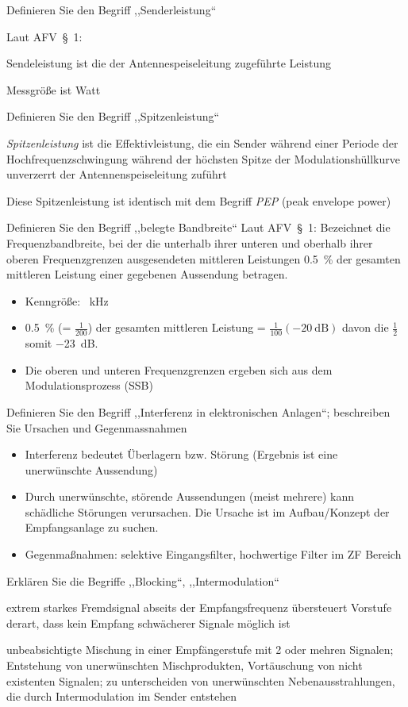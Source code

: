 \documentclass[avery5371,grid,frame,a4paper]{flashcards}
\newcommand{\card}[3]{
  \begin{flashcard}[{\chap} -- #1]{#2}#3\end{flashcard}
}
\begin{document}
\card{98}{Definieren Sie den Begriff ,,Senderleistung``}{
  \item
  Laut AFV~§~1:

  \item
  Sendeleistung ist die der Antennespeiseleitung zugeführte Leistung

  \item
  Messgröße ist Watt
}
\card{99}{Definieren Sie den Begriff ,,Spitzenleistung``}{
  \item
  \emph{Spitzenleistung} ist die Effektivleistung, die ein Sender während einer Periode der Hochfrequenzschwingung während der höchsten Spitze der Modulationshüllkurve unverzerrt der Antennenspeiseleitung zuführt

  \item Diese Spitzenleistung ist identisch mit dem Begriff \emph{PEP} (peak envelope power)
}
\card{100}{Definieren Sie den Begriff ,,belegte Bandbreite``}{
  \small
  Laut AFV~§~1: Bezeichnet die Frequenzbandbreite, bei der die unterhalb ihrer unteren und oberhalb ihrer
oberen Frequenzgrenzen ausgesendeten mittleren Leistungen \SI{0,5}{\percent} der gesamten mittleren Leistung einer gegebenen Aussendung betragen.

  \begin{itemize}
    \item Kenngröße: \SI{}{\kilo\Hz}
    \item \SI{0.5}{\percent} (= $\frac1{200}$) der gesamten mittleren Leistung = $\frac{1}{100} (-\SI{20}{\dB})$ davon die $\frac12$ somit \SI{-23}{\dB}.
    \item Die oberen und unteren Frequenzgrenzen ergeben sich aus dem Modulationsprozess (SSB)
  \end{itemize}
}
\card{101}{Definieren Sie den Begriff ,,Interferenz in elektronischen Anlagen``; beschreiben Sie Ursachen und Gegenmassnahmen}{
  \begin{itemize}
    \item Interferenz bedeutet Überlagern bzw. Störung (Ergebnis ist eine unerwünschte Aussendung)
    \item Durch unerwünschte, störende Aussendungen (meist mehrere) kann schädliche Störungen verursachen.
      Die Ursache ist im Aufbau/Konzept der Empfangsanlage zu suchen.
    \item Gegenmaßnahmen: selektive Eingangsfilter, hochwertige Filter im ZF Bereich
  \end{itemize}
}
\card{102}{Erklären Sie die Begriffe ,,Blocking``, ,,Intermodulation``}{
  \begin{description}\itemsep-7pt
    \item[Blocking]
      extrem starkes Fremdsignal abseits der Empfangsfrequenz
      übersteuert Vorstufe derart, dass kein Empfang schwächerer Signale möglich ist
    \item[Intermodulation]
      unbeabsichtigte Mischung in einer Empfängerstufe mit 2 oder mehren Signalen;
      Entstehung von unerwünschten Mischprodukten, Vortäuschung von nicht existenten Signalen;
      zu unterscheiden von unerwünschten Nebenausstrahlungen, die durch Intermodulation im Sender entstehen
  \end{description}
}
\end{document}
